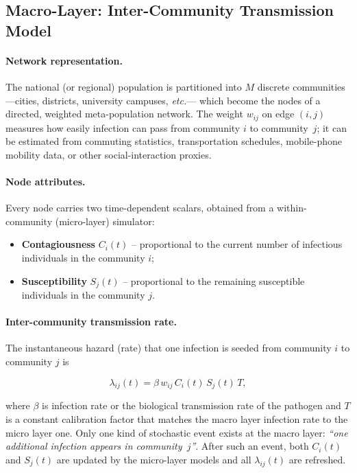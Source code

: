 \documentclass[
]{ceurart}
\begin{document}
\subsection{Macro-Layer: Inter-Community Transmission Model}
\label{subsec:macro_layer}

\paragraph{Network representation.}
The national (or regional) population is partitioned into \(M\) discrete communities---cities, districts, university campuses, \emph{etc.}--- which become the nodes of a directed, weighted meta-population network.
The weight \(w_{ij}\) on edge \((i,j)\) measures how easily infection can pass from community \(i\) to community~\(j\); it can be estimated from commuting statistics, transportation schedules, mobile-phone mobility data, or other social-interaction proxies.

\paragraph{Node attributes.}
Every node carries two time-dependent scalars, obtained from a within-community (micro-layer) simulator:

\begin{itemize}
  \item \textbf{Contagiousness} \(C_i(t)\) – proportional to the current number of infectious individuals in the community \(i\);
  \item \textbf{Susceptibility} \(S_j(t)\) – proportional to the remaining susceptible individuals in the community \(j\).
\end{itemize}

\paragraph{Inter-community transmission rate.}
The instantaneous hazard (rate) that one infection is seeded from community \(i\) to community \(j\) is

\[
  \lambda_{ij}(t)=
  \beta\,w_{ij}\,C_i(t)\,S_j(t)\,T, 
\]

where \(\beta\) is infection rate or the biological transmission rate of the pathogen and
\(T\) is a constant calibration factor that matches the macro layer infection rate to the micro layer one.  Only one kind of stochastic event exists at the macro layer:
\emph{“one additional infection appears in community~\(j\)”}.  After
such an event, both \(C_i(t)\) and \(S_j(t)\) are updated by the
micro-layer models and all \(\lambda_{ij}(t)\) are refreshed.
\end{document}
